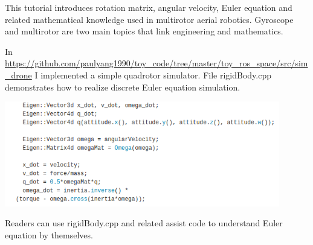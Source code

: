 \documentclass[11pt]{article}
\begin{document}
This tutorial introduces rotation matrix, angular velocity, Euler equation and related mathematical knowledge used in multirotor aerial robotics. Gyroscope and multirotor are two main topics that link engineering and mathematics.  


In \url{https://github.com/paulyang1990/toy_code/tree/master/toy_ros_space/src/sim_drone} I implemented a simple quadrotor simulator. File rigidBody.cpp demonstrates how to realize discrete Euler equation simulation.

\begin{center}
\includegraphics[width=0.9\textwidth]{images/code.png}
\end{center}

Readers can use rigidBody.cpp and related assist code to understand Euler equation by themselves.



\end{document}
